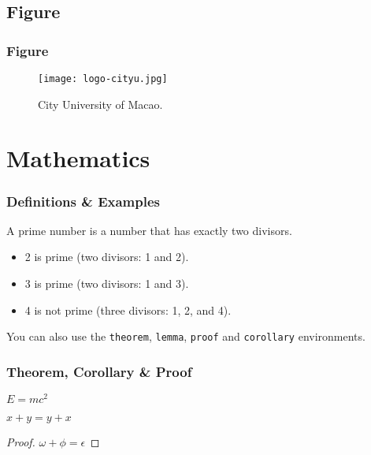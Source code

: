 \documentclass[
	9pt, %
	fontset=none,
]{beamer}
\begin{document}

\subsection{Figure}

\begin{frame}
	\frametitle{Figure}
	
	\begin{figure}
		\texttt{[image: logo-cityu.jpg]}
		\caption{City University of Macao.}
	\end{figure}
\end{frame}


\section{Mathematics}

\begin{frame}
	\frametitle{Definitions \& Examples}
	
	\begin{definition}
		A \alert{prime number} is a number that has exactly two divisors.
	\end{definition}
	
	\smallskip %
	
	\begin{example}
		\begin{itemize}
			\item 2 is prime (two divisors: 1 and 2).
			\item 3 is prime (two divisors: 1 and 3).
			\item 4 is not prime (\alert{three} divisors: 1, 2, and 4).
		\end{itemize}
	\end{example}
	
	\smallskip %
	
	You can also use the \texttt{theorem}, \texttt{lemma}, \texttt{proof} and \texttt{corollary} environments.
\end{frame}


\begin{frame}
	\frametitle{Theorem, Corollary \& Proof}
	
	\begin{theorem}
		$E = mc^2$
	\end{theorem}
	
	\begin{corollary}
		$x + y = y + x$
	\end{corollary}
	
	\begin{proof}
		$\omega + \phi = \epsilon$
	\end{proof}
\end{frame}
\end{document}
